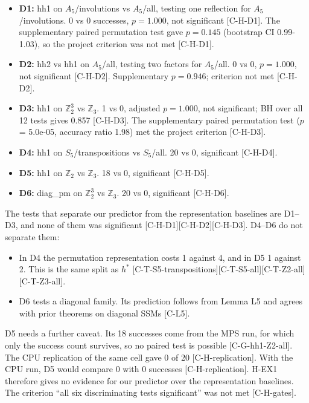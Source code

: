 \documentclass[10pt,twocolumn,a4paper]{article}
\providecommand{\tightlist}{\setlength{\itemsep}{0pt}\setlength{\parskip}{0pt}}
\begin{document}
\begin{itemize}
\tightlist
\item
  \textbf{D1:} hh1 on \(A_5\)/involutions vs \(A_5\)/all, testing one reflection for \(A_5\)/involutions. 0 vs 0 successes, \(p = 1.000\), not significant {[}C-H-D1{]}. The supplementary paired permutation test gave \(p = 0.145\) (bootstrap CI 0.99-1.03), so the project criterion was not met {[}C-H-D1{]}.
\item
  \textbf{D2:} hh2 vs hh1 on \(A_5\)/all, testing two factors for \(A_5\)/all. 0 vs 0, \(p = 1.000\), not significant {[}C-H-D2{]}. Supplementary \(p = 0.946\); criterion not met {[}C-H-D2{]}.
\item
  \textbf{D3:} hh1 on \(\mathbb{Z}_2^3\) vs \(\mathbb{Z}_3\). 1 vs 0, adjusted \(p = 1.000\), not significant; BH over all 12 tests gives 0.857 {[}C-H-D3{]}. The supplementary paired permutation test (\(p\) = 5.0e-05, accuracy ratio 1.98) met the project criterion {[}C-H-D3{]}.
\item
  \textbf{D4:} hh1 on \(S_5\)/transpositions vs \(S_5\)/all. 20 vs 0, significant {[}C-H-D4{]}.
\item
  \textbf{D5:} hh1 on \(\mathbb{Z}_2\) vs \(\mathbb{Z}_3\). 18 vs 0, significant {[}C-H-D5{]}.
\item
  \textbf{D6:} diag\_pm on \(\mathbb{Z}_2^3\) vs \(\mathbb{Z}_3\). 20 vs 0, significant {[}C-H-D6{]}.
\end{itemize}

The tests that separate our predictor from the representation baselines are D1--D3, and none of them was significant {[}C-H-D1{]}{[}C-H-D2{]}{[}C-H-D3{]}. D4--D6 do not separate them:

\begin{itemize}
\tightlist
\item
  In D4 the permutation representation costs 1 against 4, and in D5 1 against 2. This is the same split as \(h^*\) {[}C-T-S5-transpositions{]}{[}C-T-S5-all{]}{[}C-T-Z2-all{]}{[}C-T-Z3-all{]}.
\item
  D6 tests a diagonal family. Its prediction follows from Lemma L5 and agrees with prior theorems on diagonal SSMs {[}C-L5{]}.
\end{itemize}

D5 needs a further caveat. Its 18 successes come from the MPS run, for which only the success count survives, so no paired test is possible {[}C-G-hh1-Z2-all{]}. The CPU replication of the same cell gave 0 of 20 {[}C-H-replication{]}. With the CPU run, D5 would compare 0 with 0 successes {[}C-H-replication{]}. H-EX1 therefore gives no evidence for our predictor over the representation baselines. The criterion ``all six discriminating tests significant'' was not met {[}C-H-gates{]}.
\end{document}
